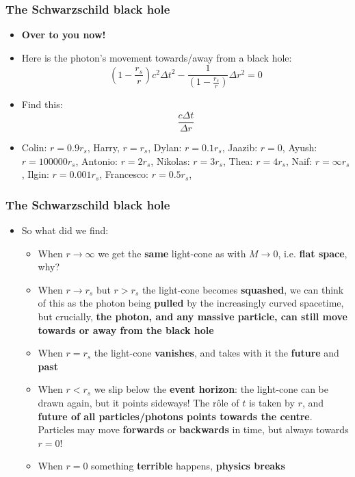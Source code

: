 \documentclass{beamer}
\begin{document}
\begin{frame}
  \frametitle{The Schwarzschild black hole}
  \begin{itemize}
    \item<1-> \textbf{Over to you now!}
    \item<2-> Here is the photon's movement towards/away from a black hole:
      \begin{equation*}
	\left( 1-\frac{r_s}{r} \right)c^2\Delta t^2-\frac{1}{\left( 1-\frac{r_s}{r} \right)}\Delta r^2=0
      \end{equation*}
    \item<3-> Find this:
      \begin{equation*}
	\frac{c\Delta t}{\Delta r}
      \end{equation*}
    \item<4-> Colin: $r=0.9r_s$, Harry, $r=r_s$, Dylan: $r=0.1r_s$, Jaazib: $r=0$, Ayush: $r=100000r_s$, Antonio: $r=2r_s$, Nikolas: $r=3r_s$, Thea: $r=4r_s$, Naif: $r=\infty r_s$, Ilgin: $r=0.001r_s$, Francesco: $r=0.5r_s$,
  \end{itemize}
\end{frame}

\begin{frame}
  \frametitle{The Schwarzschild black hole}
  \begin{itemize}
    \item<1-> So what did we find:
      \begin{itemize}
	\item<2-> When $r\to\infty$ we get the \textbf{same} light-cone as with $M\to 0$, i.e. \textbf{flat space}, why?
	\item<3-> When $r\to r_s$ but $r>r_s$ the light-cone becomes \textbf{squashed}, we can think of this as the photon being \textbf{pulled} by the increasingly curved spacetime, but crucially, \textbf{the photon, and any massive particle, can still move towards or away from the black hole}
	\item<4-> When $r=r_s$ the light-cone \textbf{vanishes}, and takes with it the \textbf{future} and \textbf{past}
	\item<5-> When $r<r_s$ we slip below the \textbf{event horizon}: the light-cone can be drawn again, but it points sideways! The r\^ole of $t$ is taken by $r$, and \textbf{future of all particles/photons points towards the centre}. Particles may move \textbf{forwards} or \textbf{backwards} in time, but always towards $r=0$!
	\item<6-> When $r=0$ something \textbf{terrible} happens, \textbf{physics breaks}
      \end{itemize}
  \end{itemize}
\end{frame}
\end{document}
